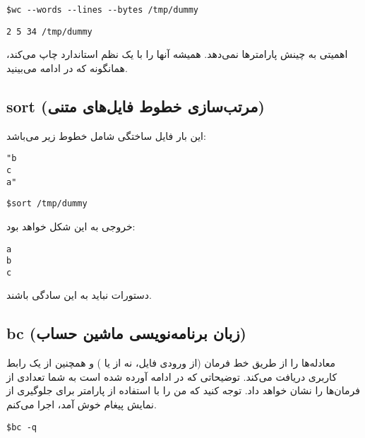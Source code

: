 \begin{latin}
\begin{lstlisting}
$wc --words --lines --bytes /tmp/dummy
\end{lstlisting}
\end{latin}

\begin{latin}
\begin{lstlisting}
2 5 34 /tmp/dummy
\end{lstlisting}
\end{latin}

 اهمیتی به چینش پارامترها نمی‌دهد.  همیشه آنها را با یک نظم استاندارد چاپ می‌کند،
همانگونه که در ادامه می‌بینید.



\subsection*{{\codefont sort} (مرتب‌سازی خطوط فایل‌های متنی)}
این بار فایل ساختگی شامل خطوط زیر می‌باشد:
\begin{latin}
\begin{lstlisting}
"b
c
a"
\end{lstlisting}
\end{latin}

\begin{latin}
\begin{lstlisting}
$sort /tmp/dummy
\end{lstlisting}
\end{latin}

خروجی به این شکل خواهد بود:
\begin{latin}
\begin{lstlisting}
a
b
c
\end{lstlisting}
\end{latin}
دستورات نباید به این سادگی باشند.

\subsection*{{\codefont bc} (زبان برنامه‌نویسی ماشین حساب)}
 معادله‌ها را از طریق خط فرمان (از ورودی فایل، نه از  یا ) و همچنین
از یک رابط کاربری دریافت می‌کند. توضیحاتی که در ادامه آورده شده است به شما تعدادی از فرمان‌ها
را نشان خواهد داد. توجه کنید که من  را با استفاده از پارامتر  برای جلوگیری
از نمایش پیغام خوش‌ آمد، اجرا می‌‌کنم.

\begin{latin}
\begin{lstlisting}
$bc -q
\end{lstlisting}
\end{latin}

